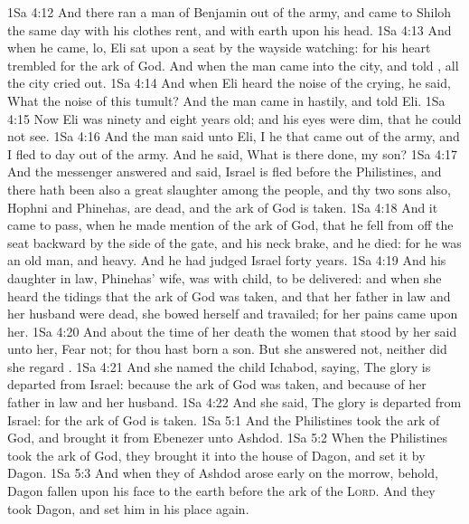 \vs 1Sa 4:12 And there ran a man of Benjamin out of the army, and came to Shiloh the same day with his clothes rent, and with earth upon his head.
\vs 1Sa 4:13 And when he came, lo, Eli sat upon a seat by the wayside watching: for his heart trembled for the ark of God. And when the man came into the city, and told , all the city cried out.
\vs 1Sa 4:14 And when Eli heard the noise of the crying, he said, What  the noise of this tumult? And the man came in hastily, and told Eli.
\vs 1Sa 4:15 Now Eli was ninety and eight years old; and his eyes were dim, that he could not see.
\vs 1Sa 4:16 And the man said unto Eli, I  he that came out of the army, and I fled to day out of the army. And he said, What is there done, my son?
\vs 1Sa 4:17 And the messenger answered and said, Israel is fled before the Philistines, and there hath been also a great slaughter among the people, and thy two sons also, Hophni and Phinehas, are dead, and the ark of God is taken.
\vs 1Sa 4:18 And it came to pass, when he made mention of the ark of God, that he fell from off the seat backward by the side of the gate, and his neck brake, and he died: for he was an old man, and heavy. And he had judged Israel forty years.
\vs 1Sa 4:19 And his daughter in law, Phinehas' wife, was with child,  to be delivered: and when she heard the tidings that the ark of God was taken, and that her father in law and her husband were dead, she bowed herself and travailed; for her pains came upon her.
\vs 1Sa 4:20 And about the time of her death the women that stood by her said unto her, Fear not; for thou hast born a son. But she answered not, neither did she regard .
\vs 1Sa 4:21 And she named the child Ichabod, saying, The glory is departed from Israel: because the ark of God was taken, and because of her father in law and her husband.
\vs 1Sa 4:22 And she said, The glory is departed from Israel: for the ark of God is taken.
\vs 1Sa 5:1 And the Philistines took the ark of God, and brought it from Ebenezer unto Ashdod.
\vs 1Sa 5:2 When the Philistines took the ark of God, they brought it into the house of Dagon, and set it by Dagon.
\vs 1Sa 5:3 And when they of Ashdod arose early on the morrow, behold, Dagon  fallen upon his face to the earth before the ark of the \textsc{Lord}. And they took Dagon, and set him in his place again.
